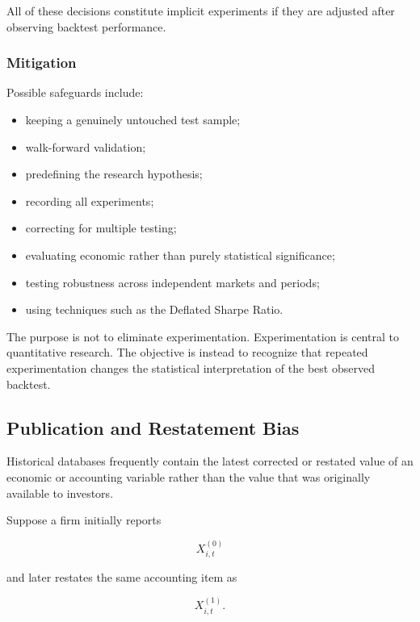 \documentclass[11pt,a4paper]{article}
\begin{document}
All of these decisions constitute implicit experiments if they are adjusted
after observing backtest performance.


\subsubsection{Mitigation}

Possible safeguards include:

\begin{itemize}
    \item keeping a genuinely untouched test sample;
    \item walk-forward validation;
    \item predefining the research hypothesis;
    \item recording all experiments;
    \item correcting for multiple testing;
    \item evaluating economic rather than purely statistical significance;
    \item testing robustness across independent markets and periods;
    \item using techniques such as the Deflated Sharpe Ratio.
\end{itemize}

The purpose is not to eliminate experimentation. Experimentation is central to
quantitative research. The objective is instead to recognize that repeated
experimentation changes the statistical interpretation of the best observed
backtest.


\subsection{Publication and Restatement Bias}
\label{subsec:publication_restatement_bias}

Historical databases frequently contain the latest corrected or restated value
of an economic or accounting variable rather than the value that was originally
available to investors.

Suppose a firm initially reports

\begin{equation}
X_{i,t}^{(0)}
\end{equation}

and later restates the same accounting item as

\begin{equation}
X_{i,t}^{(1)}.
\end{equation}
\end{document}
